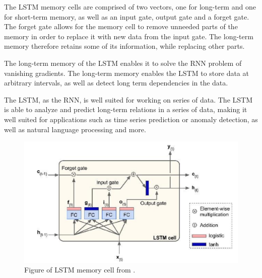 The LSTM memory cells are comprised of two vectors, one for long-term and one for short-term memory,
as well as an input gate, output gate and a forget gate.
The forget gate allows for the memory cell to remove unneeded parts of the memory in order to replace it with new data from the input gate.
The long-term memory therefore retains some of its information, while replacing other parts.

The long-term memory of the LSTM enables it to solve the RNN problem of vanishing gradients.
The long-term memory enables the LSTM to store data at arbitrary intervals, as well as detect long term dependencies in the data.

The LSTM, as the RNN, is well suited for working on series of data.
The LSTM is able to analyze and predict long-term relations in a series of data, making it well suited for applications such as time series prediction or anomaly detection,
as well as natural language processing and more.

\begin{figure}[h!]
    \centering
    \includegraphics[width=\textwidth]{./sections/BT/figures/lstm_cell_hands_on.png}
    \hfill
    \caption{Figure of LSTM memory cell from \cite[p.~492]{Geron2017}.}
    \label{fig:lstm-memory-cell}
\end{figure}



\cite[p.~492-493]{Geron2017}





